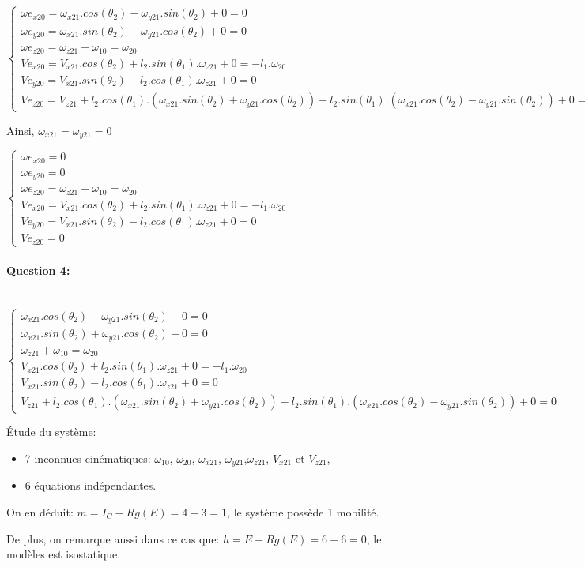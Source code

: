 $\left\{\begin{array}{l}
\omega e_{x20}=\omega_{x21}.cos(\theta_2)-\omega_{y21}.sin(\theta_2)+0=0 \\
\omega e_{y20}=\omega_{x21}.sin(\theta_2)+\omega_{y21}.cos(\theta_2)+0=0 \\
\omega e_{z20}=\omega_{z21}+\omega_{10}=\omega_{20} \\
Ve_{x20}=V_{x21}.cos(\theta_2)+l_2.sin(\theta_1).\omega_{z21}+0=-l_1.\omega_{20} \\
Ve_{y20}=V_{x21}.sin(\theta_2)-l_2.cos(\theta_1).\omega_{z21}+0=0 \\
Ve_{z20}=V_{z21}+l_2.cos(\theta_1).\left(\omega_{x21}.sin(\theta_2)+\omega_{y21}.cos(\theta_2)\right)-l_2.sin(\theta_1).\left(\omega_{x21}.cos(\theta_2)-\omega_{y21}.sin(\theta_2)\right)+0=0 
\end{array}\right.$

Ainsi, $\omega_{x21}=\omega_{y21}=0$

$\left\{\begin{array}{l}
\omega e_{x20}=0 \\
\omega e_{y20}=0 \\
\omega e_{z20}=\omega_{z21}+\omega_{10}=\omega_{20} \\
Ve_{x20}=V_{x21}.cos(\theta_2)+l_2.sin(\theta_1).\omega_{z21}+0=-l_1.\omega_{20} \\
Ve_{y20}=V_{x21}.sin(\theta_2)-l_2.cos(\theta_1).\omega_{z21}+0=0 \\
Ve_{z20}=0 
\end{array}\right.$

\paragraph{Question 4:} ~\ \\

$\left\{\begin{array}{l}
\omega_{x21}.cos(\theta_2)-\omega_{y21}.sin(\theta_2)+0=0 \\
\omega_{x21}.sin(\theta_2)+\omega_{y21}.cos(\theta_2)+0=0 \\
\omega_{z21}+\omega_{10}=\omega_{20} \\
V_{x21}.cos(\theta_2)+l_2.sin(\theta_1).\omega_{z21}+0=-l_1.\omega_{20} \\
V_{x21}.sin(\theta_2)-l_2.cos(\theta_1).\omega_{z21}+0=0 \\
V_{z21}+l_2.cos(\theta_1).\left(\omega_{x21}.sin(\theta_2)+\omega_{y21}.cos(\theta_2)\right)-l_2.sin(\theta_1).\left(\omega_{x21}.cos(\theta_2)-\omega_{y21}.sin(\theta_2)\right)+0=0 
\end{array}\right.$

Étude du système:
\begin{itemize}
 \item 7 inconnues cinématiques: $\omega_{10}$, $\omega_{20}$, $\omega_{x21}$, $\omega_{y21}$,$\omega_{z21}$, $V_{x21}$ et $V_{z21}$,
 \item 6 équations indépendantes.
\end{itemize}

On en déduit: $m = I_C - Rg(E)=4-3=1$, le système possède 1 mobilité.

De plus, on remarque aussi dans ce cas que: $h=E-Rg(E)=6-6=0$, le modèles est isostatique.


